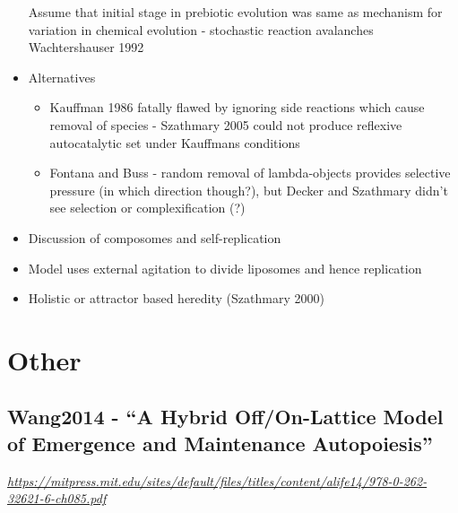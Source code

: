 \begin{itemize}
			Assume that initial stage in prebiotic evolution was same as mechanism
			for variation in chemical evolution - stochastic reaction avalanches
			Wachtershauser 1992
			
			\item
			
			Alternatives
			
			
			\begin{itemize}
				\item
				
				Kauffman 1986 fatally flawed by ignoring side reactions which cause
				removal of species - Szathmary 2005 could not produce reflexive
				autocatalytic set under Kauffmans conditions
				
				\item
				
				Fontana and Buss - random removal of lambda-objects provides
				selective pressure (in which direction though?), but Decker and
				Szathmary didn't see selection or complexification (?)
				
			\end{itemize}
			\item
			
			Discussion of composomes and self-replication
			
			\item
			
			Model uses external agitation to divide liposomes and hence
			replication
			
			\item
			
			Holistic or attractor based heredity (Szathmary 2000)
			
		\end{itemize}
		
		\hypertarget{other}{\section{Other}\label{other}}
		
		\hypertarget{wang2014---a-hybrid-offon-lattice-model-of-emergence-and-maintenance-autopoiesis}{\subsection{Wang2014
				- ``A Hybrid Off/On-Lattice Model of Emergence and Maintenance
				Autopoiesis''}\label{wang2014---a-hybrid-offon-lattice-model-of-emergence-and-maintenance-autopoiesis}}
		
		\href{https://mitpress.mit.edu/sites/default/files/titles/content/alife14/978-0-262-32621-6-ch085.pdf}{\emph{https://mitpress.mit.edu/sites/default/files/titles/content/alife14/978-0-262-32621-6-ch085.pdf}}
		
